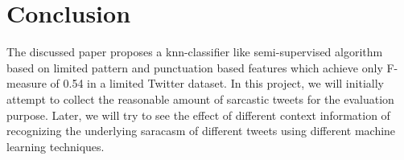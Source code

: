\section{Conclusion}
\label{sec:conclusion}
The discussed paper proposes a knn-classifier like semi-supervised algorithm based on limited pattern and punctuation based features which achieve only F-measure of 0.54 in a limited Twitter dataset. In this project, we will initially attempt to collect the reasonable amount of sarcastic tweets for the evaluation purpose. Later, we will try to see the effect of different context information of recognizing the underlying saracasm of different tweets using different machine learning techniques. 